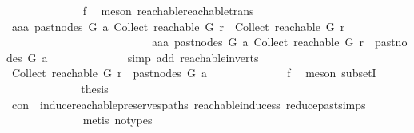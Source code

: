 \begin{isabellebody}
\ \ \ \ \ \ \ \ \ \ \ \ \isamarkupfalse%
\ f{}\ \isamarkupfalse%
\ {\isacharparenleft}{\kern0pt}meson\ reachable{}{\isacharunderscore}{\kern0pt}reachable{\isacharunderscore}{\kern0pt}trans{\isacharparenright}{\kern0pt}\isanewline
\ \ \ \ \ \ \ \ \ \ \isamarkupfalse%
\ \isamarkupfalse%
\ {\isachardoublequoteopen}aaa\ {\isacharparenleft}{\kern0pt}past{\isacharunderscore}{\kern0pt}nodes\ G\ a{\isacharparenright}{\kern0pt}\ {\isacharparenleft}{\kern0pt}Collect\ {\isacharparenleft}{\kern0pt}reachable\ G\ r{\isacharparenright}{\kern0pt}{\isacharparenright}{\kern0pt}\ {\isasymnotin}\ Collect\ {\isacharparenleft}{\kern0pt}reachable\ G\ r{\isacharparenright}{\kern0pt}\isanewline
\ \ \ \ \ \ \ \ \ \ \ \ \ \ \ \ \ \ \ \ \ \ \ \ \ {\isasymor}\ aaa\ {\isacharparenleft}{\kern0pt}past{\isacharunderscore}{\kern0pt}nodes\ G\ a{\isacharparenright}{\kern0pt}\ {\isacharparenleft}{\kern0pt}Collect\ {\isacharparenleft}{\kern0pt}reachable\ G\ r{\isacharparenright}{\kern0pt}{\isacharparenright}{\kern0pt}\ {\isasymin}\ past{\isacharunderscore}{\kern0pt}nodes\ G\ a{\isachardoublequoteclose}\isanewline
\ \ \ \ \ \ \ \ \ \ \ \ \isamarkupfalse%
\ {\isacharparenleft}{\kern0pt}simp\ add{\isacharcolon}{\kern0pt}\ reachable{\isacharunderscore}{\kern0pt}in{\isacharunderscore}{\kern0pt}verts{\isacharparenleft}{\kern0pt}{}{\isacharparenright}{\kern0pt}{\isacharparenright}{\kern0pt}\isanewline
\ \ \ \ \ \ \ \ \ \ \isamarkupfalse%
\ \isamarkupfalse%
\ {\isachardoublequoteopen}Collect\ {\isacharparenleft}{\kern0pt}reachable\ G\ r{\isacharparenright}{\kern0pt}\ {\isasymsubseteq}\ past{\isacharunderscore}{\kern0pt}nodes\ G\ a{\isachardoublequoteclose}\isanewline
\ \ \ \ \ \ \ \ \ \ \ \ \isamarkupfalse%
\ f{}\ \isamarkupfalse%
\ {\isacharparenleft}{\kern0pt}meson\ subsetI{\isacharparenright}{\kern0pt}\isanewline
\ \ \ \ \ \ \ \ \ \ \isamarkupfalse%
\ \isamarkupfalse%
\ {\isacharquery}{\kern0pt}thesis\isanewline
\ \ \ \ \ \ \ \ \ \ \ \ \isamarkupfalse%
\ con\ \ induce{\isacharunderscore}{\kern0pt}reachable{\isacharunderscore}{\kern0pt}preserves{\isacharunderscore}{\kern0pt}paths\ reachable{\isacharunderscore}{\kern0pt}induce{\isacharunderscore}{\kern0pt}ss\ reduce{\isacharunderscore}{\kern0pt}past{\isachardot}{\kern0pt}simps\isanewline
\ \ \ \ \ \ \ \ \ \ \ \ \isamarkupfalse%
\ {\isacharparenleft}{\kern0pt}metis\ {\isacharparenleft}{\kern0pt}no{\isacharunderscore}{\kern0pt}types{\isacharparenright}{\kern0pt}{\isacharparenright}{\kern0pt}\isanewline

\end{isabellebody}
